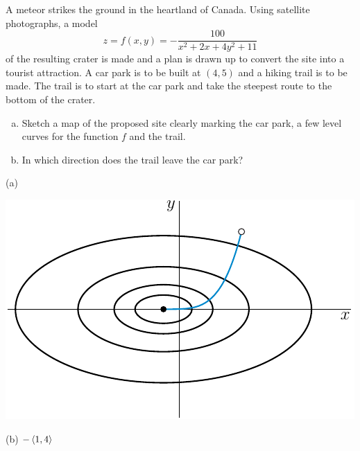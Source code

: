 \begin{question}[M200 2004A] %
A meteor strikes the ground in the heartland of Canada. 
Using satellite photographs, a model
\begin{equation*}
z=f(x,y)=-\frac{100}{x^2+2x+4y^2+11}
\end{equation*}
of the resulting crater is made and a plan is drawn up to convert the site into
a tourist attraction. A car park is to be built at  $(4,5)$ and a hiking trail is to be made. The trail is to start at the car park and take the steepest route to the bottom of the crater.
\begin{enumerate}[(a)]
\item
  Sketch a map of the proposed site clearly marking the car park, 
a few level curves for the function $f$  and the trail.

\item  
In which direction does the trail leave the car park? 
\end{enumerate}
\end{question}

%

\begin{answer}
(a) \begin{center}
     \includegraphics{fig/crater.pdf}
\end{center}

(b) $-\left< 1,4\right>$

\end{answer}

